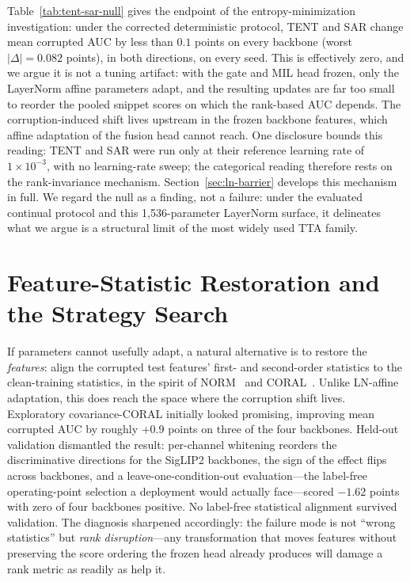 Table~\ref{tab:tent-sar-null} gives the endpoint of the entropy-minimization
investigation: under the corrected deterministic protocol, TENT and SAR
change mean corrupted AUC by less than $0.1$ points on every backbone (worst
$|\Delta| = 0.082$ points), in both directions, on every seed. This is
effectively zero, and we argue it is not a tuning artifact: with the gate and
MIL head frozen, only the LayerNorm affine parameters adapt, and the
resulting updates are far too small to reorder the pooled snippet scores on
which the rank-based AUC depends. The corruption-induced shift lives upstream
in the frozen backbone features, which affine adaptation of the fusion head
cannot reach. One disclosure bounds this reading: TENT and SAR were run
only at their reference learning rate of $1 \times 10^{-3}$, with no
learning-rate sweep; the categorical reading therefore rests on the
rank-invariance mechanism.
Section~\ref{sec:ln-barrier} develops this mechanism in full. We regard the
null as a finding, not a failure: under the evaluated continual protocol and
this 1{,}536-parameter LayerNorm surface, it delineates what we argue is a
structural limit of the most widely used TTA family.

\section{Feature-Statistic Restoration and the Strategy Search}
\label{sec:coral}

If parameters cannot usefully adapt, a natural alternative is to restore the
\emph{features}: align the corrupted test features' first- and second-order
statistics to the clean-training statistics, in the spirit of
NORM~\cite{schneider2020norm} and CORAL~\cite{sun2016coral}. Unlike LN-affine
adaptation, this does reach the space where the corruption shift lives.
Exploratory covariance-CORAL initially looked promising, improving mean
corrupted AUC by roughly $+0.9$ points on three of the four backbones. Held-out
validation dismantled the result: per-channel whitening reorders the
discriminative directions for the SigLIP2 backbones, the sign of the effect
flips across backbones, and a leave-one-condition-out evaluation---the
label-free operating-point selection a deployment would actually face---scored
$-1.62$ points with zero of four backbones positive. No label-free statistical
alignment survived validation. The diagnosis sharpened accordingly: the
failure mode is not ``wrong statistics'' but \emph{rank disruption}---any
transformation that moves features without preserving the score ordering the
frozen head already produces will damage a rank metric as readily as help it.

